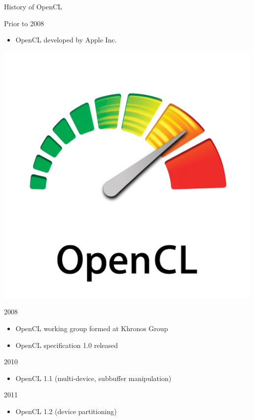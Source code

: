 

\begin{frame}{History of OpenCL}

\begin{minipage}{0.6\textwidth}
\begin{block}{Prior to 2008}
  \begin{itemize}
   \item OpenCL developed by Apple Inc.
  \end{itemize}
\end{block}
\end{minipage} \hfill
\begin{minipage}{0.2\textwidth}
 \includegraphics[width=0.99\textwidth]{figs/opencl.jpg}
\end{minipage}


\begin{block}{2008}
  \begin{itemize}
   \item OpenCL working group formed at Khronos Group
   \item OpenCL specification 1.0 released
  \end{itemize}
\end{block}

\begin{block}{2010}
  \begin{itemize}
   \item OpenCL 1.1 (multi-device, subbuffer manipulation)
  \end{itemize}
\end{block}

\begin{block}{2011}
  \begin{itemize}
   \item OpenCL 1.2 (device partitioning)
  \end{itemize}
\end{block}

\end{frame}

